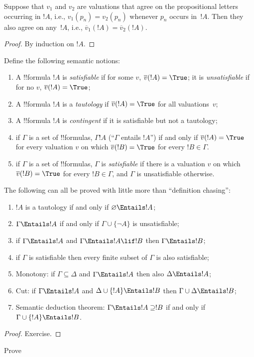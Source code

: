 \documentclass[../../../include/open-logic-section]{subfiles}
\begin{document}
\begin{thm}  
Suppose that $v_1$ and $v_2$ are valuations that agree on the
propositional letters occurring in $!A$, i.e., $v_1(p_n) = v_2(p_n)$
whenever $p_n$ occurs in~$!A$. Then they also agree on any~$!A$,
i.e., $\overline{v}_1(!A) = \overline{v}_2(!A)$. 
\end{thm}

\begin{proof} 
By induction on $!A$. 
\end{proof}

\begin{defn} 
Define the following semantic notions:
\begin{enumerate} 
\item A !!{formula} $!A$ is \emph{satisfiable} if for some $v$,
  $\overline{v}(!A) = \True$; it is \emph{unsatisfiable} if for no
  $v$, $\overline{v}(!A) = \True$;
\item A !!{formula} $!A$ is a \emph{tautology} if $\overline{v}(!A) =
  \True$ for all valuations~$v$;
\item A !!{formula} $!A$ is \emph{contingent} if it is satisfiable but
  not a tautology;
\item if $\Gamma$ is a set of !!{formula}s, $\Gamma !A$ (``$\Gamma$
  entails $!A$'') if and only if $\overline{v}(!A) = \True$ for every
  valuation $v$ on which $\overline{v}(!B) = \True$ for every $!B \in
  \Gamma$. 
\item if $\Gamma$ is a set of !!{formula}s, $\Gamma$ is
  \emph{satisfiable} if there is a valuation $v$ on which
  $\overline{v}(!B) = \True$ for every $!B \in \Gamma$, and $\Gamma$
  is unsatisfiable otherwise. 
\end{enumerate} 
\end{defn}

\begin{prop}
The following can all be proved
with little more than ``definition chasing'': 
\begin{enumerate} 
\item $!A$ is a tautology if and only if
  $\varnothing \Entails !A$; 
\item $\Gamma \Entails !A$ if and only if $\Gamma \cup \{ \lnot\!A\}$
  is unsatisfiable; 
\item if $\Gamma \Entails !A$ and $\Gamma \Entails !A \lif !B$ then
  $\Gamma \Entails !B$;
\item if $\Gamma$ is satisfiable then every finite subset of $\Gamma$
  is also satisfiable; 
\item {} Monotony: if $\Gamma \subseteq \Delta$
  and $\Gamma \Entails !A$ then also $\Delta \Entails !A$;
\item {} Cut: if $\Gamma \Entails !A$ and $\Delta \cup \{
!A\} \Entails !B$ then $\Gamma \cup \Delta \Entails !B$; 
\item
{} Semantic deduction theorem: $\Gamma
\Entails !A \supseteq !B$ if and only if $\Gamma \cup \{!A\} \Entails
!B$.
\end{enumerate}
\end{prop}

\begin{proof}
Exercise.
\end{proof}

\begin{prob}
Prove 
\end{prob}
\end{document}
